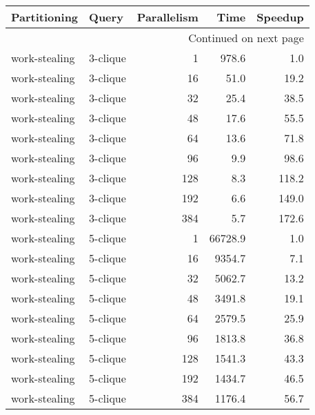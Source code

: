 \begin{longtable}{llr|rr}
\toprule
  Partitioning &     Query &  Parallelism &     Time &  Speedup \\
\midrule
\endhead
\midrule
\multicolumn{5}{r}{{Continued on next page}} \\
\midrule
\endfoot

\bottomrule
\endlastfoot
 work-stealing &  3-clique &            1 &    978.6 &      1.0 \\
 work-stealing &  3-clique &           16 &     51.0 &     19.2 \\
 work-stealing &  3-clique &           32 &     25.4 &     38.5 \\
 work-stealing &  3-clique &           48 &     17.6 &     55.5 \\
 work-stealing &  3-clique &           64 &     13.6 &     71.8 \\
 work-stealing &  3-clique &           96 &      9.9 &     98.6 \\
 work-stealing &  3-clique &          128 &      8.3 &    118.2 \\
 work-stealing &  3-clique &          192 &      6.6 &    149.0 \\
 work-stealing &  3-clique &          384 &      5.7 &    172.6 \\
 work-stealing &  5-clique &            1 &  66728.9 &      1.0 \\
 work-stealing &  5-clique &           16 &   9354.7 &      7.1 \\
 work-stealing &  5-clique &           32 &   5062.7 &     13.2 \\
 work-stealing &  5-clique &           48 &   3491.8 &     19.1 \\
 work-stealing &  5-clique &           64 &   2579.5 &     25.9 \\
 work-stealing &  5-clique &           96 &   1813.8 &     36.8 \\
 work-stealing &  5-clique &          128 &   1541.3 &     43.3 \\
 work-stealing &  5-clique &          192 &   1434.7 &     46.5 \\
 work-stealing &  5-clique &          384 &   1176.4 &     56.7 \\
\end{longtable}
